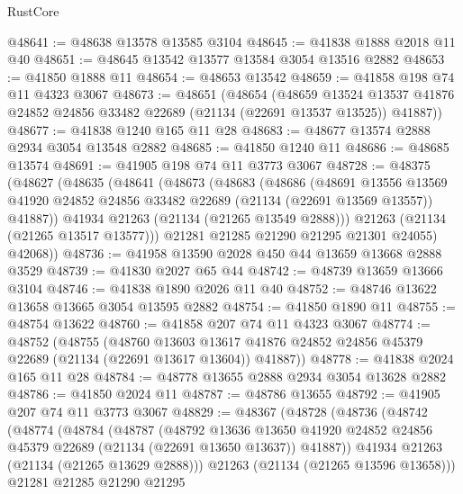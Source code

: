 \begin{lexlean}{RustCore}
\begin{coremodule}
@48641 := @48638 @13578 @13585 @3104
@48645 := @41838 @1888 @2018 @11 @40
@48651 := @48645 @13542 @13577 @13584 @3054 @13516 @2882
@48653 := @41850 @1888 @11
@48654 := @48653 @13542
@48659 := @41858 @198 @74 @11 @4323 @3067
@48673 := @48651
    (@48654
      (@48659
        @13524
        @13537
        @41876
        @24852
        @24856
        @33482
        @22689
        (@21134 (@22691 @13537 @13525))
        @41887))
@48677 := @41838 @1240 @165 @11 @28
@48683 := @48677 @13574 @2888 @2934 @3054 @13548 @2882
@48685 := @41850 @1240 @11
@48686 := @48685 @13574
@48691 := @41905 @198 @74 @11 @3773 @3067
@48728 := @48375
    (@48627
      (@48635
        (@48641
          (@48673
            (@48683
              (@48686
                (@48691
                  @13556
                  @13569
                  @41920
                  @24852
                  @24856
                  @33482
                  @22689
                  (@21134 (@22691 @13569 @13557))
                  @41887))
              @41934
              @21263
              (@21134 (@21265 @13549 @2888)))
            @21263
            (@21134 (@21265 @13517 @13577)))
          @21281
          @21285
          @21290
          @21295
          @21301
          @24055)
        @42068))
@48736 := @41958 @13590 @2028 @450 @44 @13659 @13668 @2888 @3529
@48739 := @41830 @2027 @65 @44
@48742 := @48739 @13659 @13666 @3104
@48746 := @41838 @1890 @2026 @11 @40
@48752 := @48746 @13622 @13658 @13665 @3054 @13595 @2882
@48754 := @41850 @1890 @11
@48755 := @48754 @13622
@48760 := @41858 @207 @74 @11 @4323 @3067
@48774 := @48752
    (@48755
      (@48760
        @13603
        @13617
        @41876
        @24852
        @24856
        @45379
        @22689
        (@21134 (@22691 @13617 @13604))
        @41887))
@48778 := @41838 @2024 @165 @11 @28
@48784 := @48778 @13655 @2888 @2934 @3054 @13628 @2882
@48786 := @41850 @2024 @11
@48787 := @48786 @13655
@48792 := @41905 @207 @74 @11 @3773 @3067
@48829 := @48367
    (@48728
      (@48736
        (@48742
          (@48774
            (@48784
              (@48787
                (@48792
                  @13636
                  @13650
                  @41920
                  @24852
                  @24856
                  @45379
                  @22689
                  (@21134 (@22691 @13650 @13637))
                  @41887))
              @41934
              @21263
              (@21134 (@21265 @13629 @2888)))
            @21263
            (@21134 (@21265 @13596 @13658)))
          @21281
          @21285
          @21290
          @21295

\end{coremodule}
\end{lexlean}
